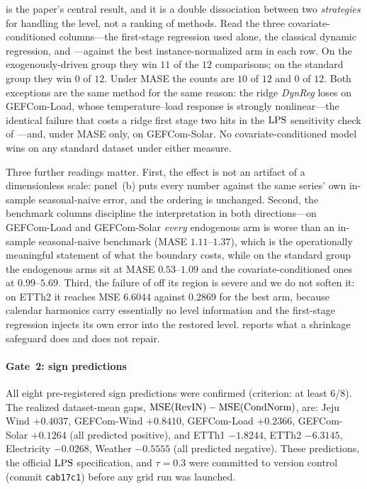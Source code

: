  is the paper's central result, and it is a double dissociation between two \emph{strategies} for handling the level, not a ranking of methods. Read the three covariate-conditioned columns---the first-stage regression used alone, the classical dynamic regression, and \cnm---against the best instance-normalized arm in each row. On the exogenously-driven group they win $11$ of the $12$ comparisons; on the standard group they win $0$ of $12$. Under MASE the counts are $10$ of $12$ and $0$ of $12$. Both exceptions are the same method for the same reason: the ridge \emph{DynReg} loses on GEFCom-Load, whose temperature--load response is strongly nonlinear---the identical failure that costs a ridge first stage two hits in the $\mathrm{LPS}$ sensitivity check of ---and, under MASE only, on GEFCom-Solar. No covariate-conditioned model wins on any standard dataset under either measure.

Three further readings matter. First, the effect is not an artifact of a dimensionless scale: panel~(b) puts every number against the same series' own in-sample seasonal-naive error, and the ordering is unchanged. Second, the benchmark columns discipline the interpretation in both directions---on GEFCom-Load and GEFCom-Solar \emph{every} endogenous arm is worse than an in-sample seasonal-naive benchmark (MASE $1.11$--$1.37$), which is the operationally meaningful statement of what the boundary costs, while on the standard group the endogenous arms sit at MASE $0.53$--$1.09$ and the covariate-conditioned ones at $0.99$--$5.69$. Third, the failure of \cnm{} off its region is severe and we do not soften it: on ETTh2 it reaches MSE $6.6044$ against $0.2869$ for the best arm, because calendar harmonics carry essentially no level information and the first-stage regression injects its own error into the restored level.  reports what a shrinkage safeguard does and does not repair.

\paragraph{Gate~2: sign predictions} All eight pre-registered sign predictions were confirmed (criterion: at least 6/8). The realized dataset-mean gaps, $\mathrm{MSE}(\text{RevIN})-\mathrm{MSE}(\text{CondNorm})$, are: Jeju Wind $+0.4037$, GEFCom-Wind $+0.8410$, GEFCom-Load $+0.2366$, GEFCom-Solar $+0.1264$ (all predicted positive), and ETTh1 $-1.8244$, ETTh2 $-6.3145$, Electricity $-0.0268$, Weather $-0.5555$ (all predicted negative). These predictions, the official $\mathrm{LPS}$ specification, and $\tau=0.3$ were committed to version control (commit \texttt{cab17c1}) before any grid run was launched.

